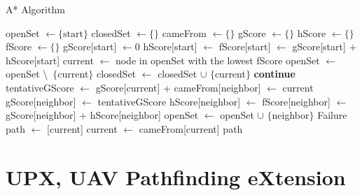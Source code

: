 \documentclass[12pt]{report}
\begin{document}
        \begin{algorithm}
        \caption{A* Algorithm}
        \begin{algorithmic}[1]
            \State openSet $\gets \{\text{start}\}$
            \State closedSet $\gets \{\}$
            \State cameFrom $\gets \{\}$
            \State gScore $\gets \{\}$
            \State hScore $\gets \{\}$
            \State fScore $\gets \{\}$
            \State gScore[start] $\gets 0$
            \State hScore[start] $\gets$ 
            \State fScore[start] $\gets$ gScore[start] + hScore[start]
                \State current $\gets$ node in openSet with the lowest fScore
                    \State \Return {}
                \EndIf
                \State openSet $\gets$ openSet \textbackslash\ $\{$current$\}$
                \State closedSet $\gets$ closedSet $\cup$ $\{$current$\}$
                        \State \textbf{continue}
                    \EndIf
                    \State tentativeGScore $\gets$ gScore[current] + 
                        \State cameFrom[neighbor] $\gets$ current
                        \State gScore[neighbor] $\gets$ tentativeGScore
                        \State hScore[neighbor] $\gets$ 
                        \State fScore[neighbor] $\gets$ gScore[neighbor] + hScore[neighbor]
                            \State openSet $\gets$ openSet $\cup$ $\{$neighbor$\}$
                        \EndIf
                    \EndIf
                \EndFor
            \EndWhile
            \State \Return Failure
        \EndFunction
        \Statex
            \State path $\gets$ [current]
                \State current $\gets$ cameFrom[current]
                \State {}
            \EndWhile
            \State \Return path
        \EndFunction
        \end{algorithmic}
        \end{algorithm}

    \section{UPX, UAV Pathfinding eXtension}
\end{document}
